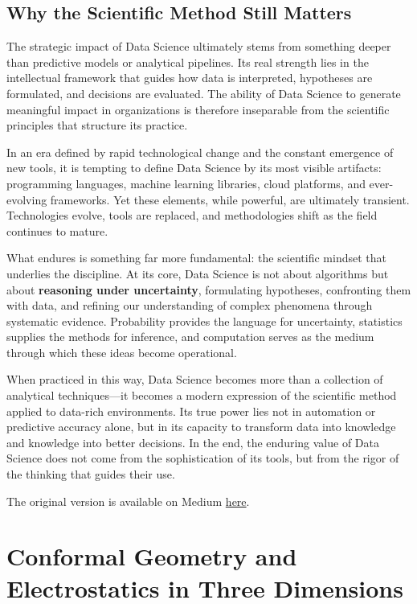 \documentclass[
  12pt,
  letterpaper,
]{book}
\begin{document}
\section{Why the Scientific Method Still
Matters}\label{why-the-scientific-method-still-matters}

The strategic impact of Data Science ultimately stems from something
deeper than predictive models or analytical pipelines. Its real strength
lies in the intellectual framework that guides how data is interpreted,
hypotheses are formulated, and decisions are evaluated. The ability of
Data Science to generate meaningful impact in organizations is therefore
inseparable from the scientific principles that structure its practice.

In an era defined by rapid technological change and the constant
emergence of new tools, it is tempting to define Data Science by its
most visible artifacts: programming languages, machine learning
libraries, cloud platforms, and ever-evolving frameworks. Yet these
elements, while powerful, are ultimately transient. Technologies evolve,
tools are replaced, and methodologies shift as the field continues to
mature.

What endures is something far more fundamental: the scientific mindset
that underlies the discipline. At its core, Data Science is not about
algorithms but about \textbf{reasoning under uncertainty}, formulating
hypotheses, confronting them with data, and refining our understanding
of complex phenomena through systematic evidence. Probability provides
the language for uncertainty, statistics supplies the methods for
inference, and computation serves as the medium through which these
ideas become operational.

When practiced in this way, Data Science becomes more than a collection
of analytical techniques---it becomes a modern expression of the
scientific method applied to data-rich environments. Its true power lies
not in automation or predictive accuracy alone, but in its capacity to
transform data into knowledge and knowledge into better decisions. In
the end, the enduring value of Data Science does not come from the
sophistication of its tools, but from the rigor of the thinking that
guides their use.

The original version is available on Medium
\href{https://medium.com/@rodrigokang88/data-science-in-the-age-of-hype-4d19943f0398}{here}.

\chapter{Conformal Geometry and Electrostatics in Three
Dimensions}\label{conformal-geometry-and-electrostatics-in-three-dimensions}
\end{document}
